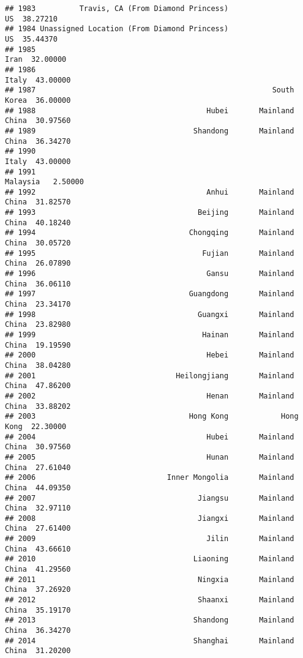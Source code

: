 \documentclass[
]{article}
\begin{document}
\begin{verbatim}
## 1983          Travis, CA (From Diamond Princess)                   US  38.27210
## 1984 Unassigned Location (From Diamond Princess)                   US  35.44370
## 1985                                                             Iran  32.00000
## 1986                                                            Italy  43.00000
## 1987                                                      South Korea  36.00000
## 1988                                       Hubei       Mainland China  30.97560
## 1989                                    Shandong       Mainland China  36.34270
## 1990                                                            Italy  43.00000
## 1991                                                         Malaysia   2.50000
## 1992                                       Anhui       Mainland China  31.82570
## 1993                                     Beijing       Mainland China  40.18240
## 1994                                   Chongqing       Mainland China  30.05720
## 1995                                      Fujian       Mainland China  26.07890
## 1996                                       Gansu       Mainland China  36.06110
## 1997                                   Guangdong       Mainland China  23.34170
## 1998                                     Guangxi       Mainland China  23.82980
## 1999                                      Hainan       Mainland China  19.19590
## 2000                                       Hebei       Mainland China  38.04280
## 2001                                Heilongjiang       Mainland China  47.86200
## 2002                                       Henan       Mainland China  33.88202
## 2003                                   Hong Kong            Hong Kong  22.30000
## 2004                                       Hubei       Mainland China  30.97560
## 2005                                       Hunan       Mainland China  27.61040
## 2006                              Inner Mongolia       Mainland China  44.09350
## 2007                                     Jiangsu       Mainland China  32.97110
## 2008                                     Jiangxi       Mainland China  27.61400
## 2009                                       Jilin       Mainland China  43.66610
## 2010                                    Liaoning       Mainland China  41.29560
## 2011                                     Ningxia       Mainland China  37.26920
## 2012                                     Shaanxi       Mainland China  35.19170
## 2013                                    Shandong       Mainland China  36.34270
## 2014                                    Shanghai       Mainland China  31.20200

\end{verbatim}
\end{document}

